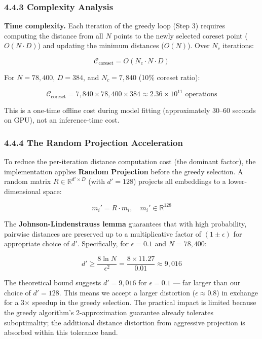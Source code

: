 \documentclass[12pt, a4paper, oneside]{report}
\begin{document}
\subsubsection{4.4.3 Complexity Analysis}\label{complexity-analysis}

\textbf{Time complexity.} Each iteration of the greedy loop (Step 3) requires computing the distance from all \(N\) points to the newly selected coreset point (\(O(N \cdot D)\)) and updating the minimum distances (\(O(N)\)). Over \(N_c\) iterations:

\[\mathcal{C}_{\text{coreset}} = O(N_c \cdot N \cdot D)\]

For \(N = 78{,}400\), \(D = 384\), and \(N_c = 7{,}840\) (10\% coreset ratio):

\[\mathcal{C}_{\text{coreset}} = 7{,}840 \times 78{,}400 \times 384 \approx 2.36 \times 10^{11} \text{ operations}\]

This is a one-time offline cost during model fitting (approximately 30--60 seconds on GPU), not an inference-time cost.

\subsubsection{4.4.4 The Random Projection Acceleration}\label{the-random-projection-acceleration}

To reduce the per-iteration distance computation cost (the dominant factor), the implementation applies \textbf{Random Projection} before the greedy selection. A random matrix \(R \in \mathbb{R}^{d' \times D}\) (with \(d' = 128\)) projects all embeddings to a lower-dimensional space:

\[m_i' = R \cdot m_i, \quad m_i' \in \mathbb{R}^{128}\]

The \textbf{Johnson-Lindenstrauss lemma} guarantees that with high probability, pairwise distances are preserved up to a multiplicative factor of \((1 \pm \epsilon)\) for appropriate choice of \(d'\). Specifically, for \(\epsilon = 0.1\) and \(N = 78{,}400\):

\[d' \geq \frac{8 \ln N}{\epsilon^2} = \frac{8 \times 11.27}{0.01} \approx 9{,}016\]

The theoretical bound suggests \(d' = 9{,}016\) for \(\epsilon = 0.1\) --- far larger than our choice of \(d' = 128\). This means we accept a larger distortion (\(\epsilon \approx 0.8\)) in exchange for a 3$\times$ speedup in the greedy selection. The practical impact is limited because the greedy algorithm's 2-approximation guarantee already tolerates suboptimality; the additional distance distortion from aggressive projection is absorbed within this tolerance band.
\end{document}
